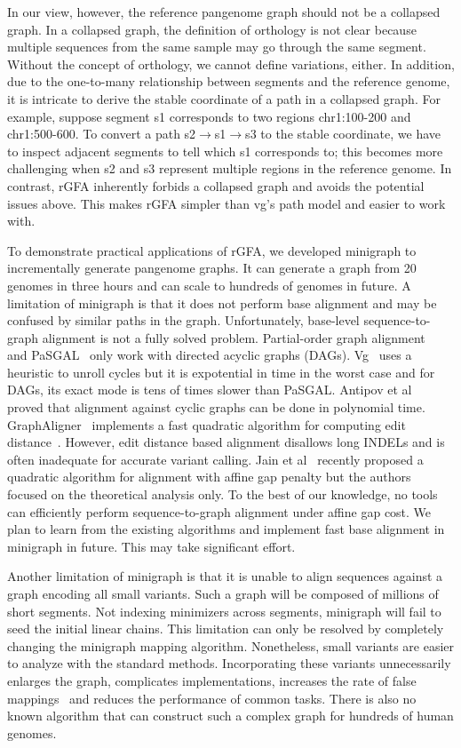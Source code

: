 \documentclass[twocolumn]{bmcart}
\begin{document}
In our view, however, the reference pangenome graph should not be a collapsed
graph. In a collapsed graph, the definition of orthology is not clear because
multiple sequences from the same sample may go through the same segment.
Without the concept of orthology, we cannot define variations, either.  In
addition, due to the one-to-many relationship between segments and the
reference genome, it is intricate to derive the stable coordinate of a path in
a collapsed graph. For example, suppose segment {\sf s1} corresponds to two
regions {\sf chr1:100-200} and {\sf chr1:500-600}. To convert a path {\sf
s2$\to$s1$\to$s3} to the stable coordinate, we have to inspect adjacent
segments to tell which {\sf s1} corresponds to; this becomes more challenging
when {\sf s2} and {\sf s3} represent multiple regions in the reference genome.
In contrast, rGFA inherently forbids a collapsed graph and avoids the potential
issues above. This makes rGFA simpler than vg's path model and easier to work
with.

To demonstrate practical applications of rGFA, we developed minigraph to
incrementally generate pangenome graphs. It can generate a graph from 20
genomes in three hours and can scale to hundreds of genomes in future. A
limitation of minigraph is that it does not perform base alignment and may be
confused by similar paths in the graph. {\color{blue} Unfortunately, base-level
sequence-to-graph alignment is not a fully solved problem. Partial-order graph
alignment~\cite{Lee_2002} and PaSGAL~\cite{DBLP:conf/ipps/JainMZDA19} only work
with directed acyclic graphs (DAGs). Vg~\cite{Garrison:2018aa} uses a heuristic
to unroll cycles but it is expotential in time in the worst case and for DAGs,
its exact mode is tens of times slower than PaSGAL. Antipov et
al~\cite{Antipov:2016aa} proved that alignment against cyclic graphs can be
done in polynomial time. GraphAligner~\cite{Rautiainen810812} implements a
fast quadratic algorithm for computing edit distance~\cite{Rautiainen_2019}.
However, edit distance based alignment disallows long INDELs and is often
inadequate for accurate variant calling. Jain et al~\cite{Jain_2020} recently
proposed a quadratic algorithm for alignment with affine gap penalty but the
authors focused on the theoretical analysis only. To the best of our knowledge,
no tools can efficiently perform sequence-to-graph alignment under affine gap
cost. We plan to learn from the existing algorithms and implement fast base
alignment in minigraph in future. This may take significant effort.}

Another limitation of minigraph is
that it is unable to align sequences against a graph encoding all small variants.
Such a graph will be composed of millions of short segments. Not
indexing minimizers across segments, minigraph will fail to seed the initial
linear chains. This limitation can only be resolved by completely changing the
minigraph mapping algorithm. Nonetheless, small variants are easier to
analyze with the standard methods. Incorporating these variants unnecessarily
enlarges the graph, complicates implementations, increases the rate of false
mappings~\cite{Pritt_2018} and reduces the performance of common tasks. There
is also no known algorithm that can construct such a complex graph for hundreds
of human genomes.
\end{document}
